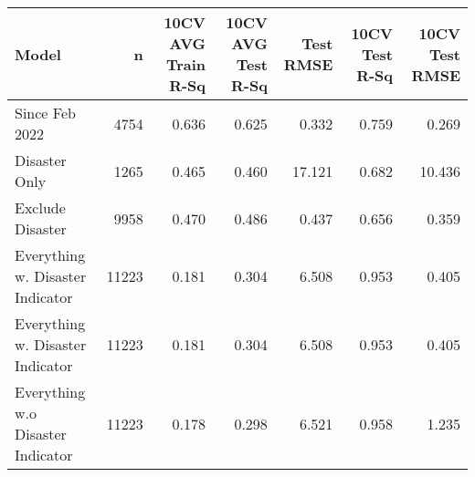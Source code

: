
\begin{tabular}{l|r|r|r|r|r|r}
\hline
Model & n & 10CV AVG Train R-Sq & 10CV AVG Test R-Sq & Test RMSE & 10CV Test R-Sq & 10CV Test RMSE\\
\hline
Since Feb 2022 & 4754 & 0.636 & 0.625 & 0.332 & 0.759 & 0.269\\
\hline
Disaster Only & 1265 & 0.465 & 0.460 & 17.121 & 0.682 & 10.436\\
\hline
Exclude Disaster & 9958 & 0.470 & 0.486 & 0.437 & 0.656 & 0.359\\
\hline
Everything w. Disaster Indicator & 11223 & 0.181 & 0.304 & 6.508 & 0.953 & 0.405\\
\hline
Everything w. Disaster Indicator & 11223 & 0.181 & 0.304 & 6.508 & 0.953 & 0.405\\
\hline
Everything w.o Disaster Indicator & 11223 & 0.178 & 0.298 & 6.521 & 0.958 & 1.235\\
\hline
\end{tabular}

